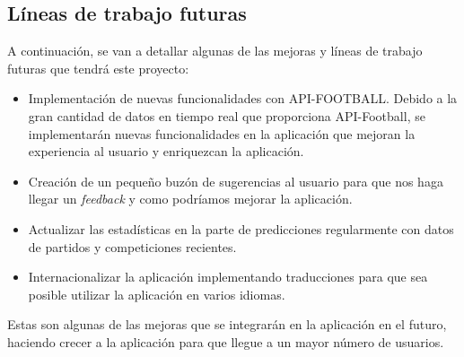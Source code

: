 \subsection{Líneas de trabajo futuras}
A continuación, se van a detallar algunas de las mejoras y líneas de trabajo futuras que tendrá este proyecto:
\begin{itemize}
    \item Implementación de nuevas funcionalidades con API-FOOTBALL. Debido a la gran cantidad de datos en tiempo real que proporciona API-Football, se implementarán nuevas funcionalidades en la aplicación que mejoran la experiencia al usuario y enriquezcan la aplicación.
    \item Creación de un pequeño buzón de sugerencias al usuario para que nos haga llegar un \textit{feedback} y como podríamos mejorar la aplicación.
    \item Actualizar las estadísticas en la parte de predicciones regularmente con datos de partidos y competiciones recientes.
    \item Internacionalizar la aplicación implementando traducciones para que sea posible utilizar la aplicación en varios idiomas.
\end{itemize}

Estas son algunas de las mejoras que se integrarán en la aplicación en el futuro, haciendo crecer a la aplicación para que llegue a un mayor número de usuarios.
